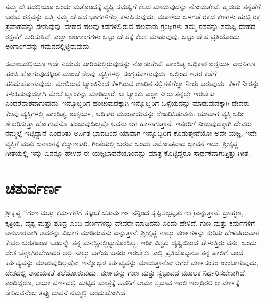ನಮ್ಮ ದೇಹದಲ್ಲಿಯೂ ಒಂದು ಮತ್ತೊಂದಕ್ಕೆ ವ್ಯಷ್ಟಿ ಸಮಷ್ಟಿಗೆ ಕೆಲಸ ಮಾಡುವುದನ್ನು ನೋಡುತ್ತೇವೆ. ಹೃದಯ ತನ್ನೆಡೆಗೆ ಬರುವ ರಕ್ತವನ್ನು ಒತ್ತಿ ನಮ್ಮ ದೇಹದ ಭಾಗಗಳಿಗೆಲ್ಲ ಕಳುಹಿಸುವುದು. ಮೂಳೆಯ ಒಳಗಡೆ ರಕ್ತದ ಕಣಗಳು ಹುಟ್ಟಿ ರಕ್ತ ಪ್ರವಾಹವನ್ನು ಸೇರುವುವು. ದೇಹದ ಹಲವು ಕಡೆಗಳಲ್ಲಿರುವ ಹಲವಾರು ಗ್ರಂಥಿಗಳು ತಮ್ಮ ರಸವನ್ನು ಸಮಷ್ಟಿ ದೇಹದ ರಕ್ಷಣೆಗೆ ಸುರಿಸುತ್ತಿವೆ. ಎಲ್ಲಾ ಅಂಗಾಂಗಗಳು ಒಟ್ಟು ದೇಹಕ್ಕೆ ಕೆಲಸ ಮಾಡುವುವು. ಒಟ್ಟು ದೇಹ ಪ್ರತಿಯೊಂದು ಅಂಗಾಂಗವನ್ನು ಗಮನದಲ್ಲಿಟ್ಟಿರುವುದು.

ಸಮಾಜದಲ್ಲಿಯೂ ಇದೇ ನಿಯಮ ಜಾರಿಯಲ್ಲಿರುವುದನ್ನು ನೋಡುತ್ತೇವೆ. ಪಾಂಡಿತ್ಯ ಅಧಿಕಾರ ಐಶ್ವರ್ಯ ಎಲ್ಲರಿಗೂ ಹಂಚಿ ಹೋಗುವುದಕ್ಕಿಂತ ಮುಂಚೆ ಕೆಲವು ವ್ಯಕ್ತಿಗಳಲ್ಲಿ ಸಂಗ್ರಹವಾಗುವುದು. ಅಲ್ಲಿಂದ ಇತರ ಕಡೆಗೆ ಹರಿದುಹೋಗುವುದು. ಮೇಲಿರುವ ಟ್ಯಾಂಕಿನಿಂದ ಕೆಳಗಿರುವ ಊರಿನ ನಲ್ಲಿಗಳಿಗೆಲ್ಲಾ ನೀರು ಬರುವುದು. ಕೆಳಗೆ ನೀರನ್ನು ಕಳುಹಿಸುವುದಕ್ಕಾಗಿ ಮೇಲೆ ಟ್ಯಾಂಕನ್ನು ಮಾಡಿದ್ದಾರೆ. ಆ ಟ್ಯಾಂಕು ಎಲ್ಲಾ ನೀರು ತನ್ನಲ್ಲೇ ಇರಬೇಕು ಎಂದರೆ\break ನಾಶವಾಗುವುದು. ಇನ್ನೊಬ್ಬರಿಗೆ ಹಂಚುವುದಕ್ಕಾಗಿ ಇನ್ನೊಬ್ಬರಿಗೆ ಒಳ್ಳೆಯದನ್ನು ಮಾಡುವುದಕ್ಕಾಗಿ ದೇವರು ಕೆಲವು ವ್ಯಕ್ತಿಗಳಲ್ಲಿ ಪಾಂಡಿತ್ಯ, ಐಶ್ವರ್ಯ, ಅಧಿಕಾರ ಮುಂತಾದುವನ್ನು ಶೇಖರಿಸಿಡುವನು. ಯಾವಾಗ ವ್ಯಕ್ತಿ ಬರೀ ಶೇಖರಿಸುತ್ತಾ ಹೋಗುವನೊ ಹಂಚುವುದಿಲ್ಲವೊ ಅವನು ಆಗ ಹಾಳಾಗುತ್ತಾನೆ. ಇತರರಿಗೆ ನೀಡುವುದಕ್ಕಾಗಿ ದೇವರು ನಮ್ಮಲ್ಲೆ ಇಟ್ಟಿದ್ದಾನೆ ಎಂದರಿತು ಅರ್ಪಿತ ಭಾವದಿಂದ ಯಾವಾಗ ಇನ್ನೊಬ್ಬರಿಗೆ ಕೊಡುತ್ತೇವೆಯೋ ಅದೇ ಯಜ್ಞ, ಇದೇ ವ್ಯಕ್ತಿಗೆ ಮತ್ತು ಜನಾಂಗಕ್ಕೆ ಕಲ್ಯಾಣಕಾರಿ. ಗೀತೆಯಲ್ಲಿ ಬರುವ ಒಂದು ಅಮೋಘವಾದ ಭಾವನೆ ಇದು. ಶ‍್ರೀಕೃಷ್ಣ ಗೀತೆಯಲ್ಲಿ ಇನ್ನು ಏನನ್ನೂ ಹೇಳದೆ ಈ ಯಜ್ಞಭಾವನೆಯೊಂದನ್ನು ಮಾತ್ರ ಕೊಟ್ಟಿದ್ದರೂ ಸಾರ್ಥಕ\-ವಾಗುತ್ತಿತ್ತು ಗೀತೆ.


\section*{ಚತುರ್ವರ್ಣ}

ಶ‍್ರೀಕೃಷ್ಣ “ಗುಣ ಮತ್ತು ಕರ್ಮಗಳಿಗೆ ತಕ್ಕಂತೆ ಚತುರ್ವರ್ಣ ನನ್ನಿಂದ ಸೃಷ್ಟಿಸಲ್ಪಟ್ಟಿತು ೧೩)ಎನ್ನುತ್ತಾನೆ. ಬ್ರಾಹ್ಮಣ, ಕ್ಷತ್ರಿಯ, ವೈಶ್ಯ ಮತ್ತು ಶೂದ್ರ ಎಂಬ ವರ್ಣಗಳನ್ನು ದೇವರೇ ಮಾಡಿದನು ಎಂದು ಹೇಳಿದೆ. ಗುಣ ಮತ್ತು ಕರ್ಮಗಳಿಗೆ ಅನುಸಾರವಾಗಿ ಅವರನ್ನು ವಿಭಾಗ ಮಾಡಿರುವೆನು ಎನ್ನುತ್ತಾನೆ. ಶ‍್ರೀಕೃಷ್ಣ ನಾಲ್ಕು ವರ್ಣಗಳನ್ನು ಕುರಿತು ಹೇಳುತ್ತಿರುವಾಗ ಕೇವಲ ಭರತಖಂಡ ಒಂದನ್ನೇ ತನ್ನ ಮನಸ್ಸಿನಲ್ಲಿಟ್ಟುಕೊಂಡಿಲ್ಲ. ಇಡೀ ವಿಶ್ವದ ದೃಷ್ಟಿಯಿಂದ ಹೇಳುತ್ತಿರು ವನು. ಒಂದು ದೇಶ ಚೆನ್ನಾಗಿರಬೇಕಾದರೆ ಅಲ್ಲಿ ನಾಲ್ಕು ಬಗೆಯ ಜನರು ಇರಬೇಕು. ಎಲ್ಲಿ ಪ್ರತಿಯೊಬ್ಬನೂ ತನ್ನ ಪಾಲಿಗೆ ಬಂದ ಕರ್ತವ್ಯವನ್ನು ಮಾಡುವುದಿಲ್ಲವೋ, ಇನ್ನೊಬ್ಬರ ಕರ್ತವ್ಯವನ್ನು ಮಾಡುತ್ತಾನೋ ಆಗಲೆ ವರ್ಣಸಂಕರ ಉಂಟಾಗುವುದು, ದೇಶದಲ್ಲಿ ಅನಾಯಕತೆ ತಲೆದೋರುವುದು. ವರ್ಣವನ್ನು ಗುಣ ಮತ್ತು ಸ್ವಭಾವದ ಮೂಲಕ ನಿರ್ಧರಿಸಬೇಕಾಗಿದೆ ಎಂದಿದ್ದರೂ, ಆಯಾ ವರ್ಣದಲ್ಲಿ ಹುಟ್ಟಿದ ಮಾತ್ರಕ್ಕೆ ಅವನಿಗೆ ಆಯಾ ಸ್ವಭಾವ ಇರಲಿ ಇಲ್ಲದಿರಲಿ ಆ ವರ್ಣಕ್ಕೆ ಸೇರಿದವನೆಂಬ ತಪ್ಪು ಭಾವನೆ ನಮ್ಮಲ್ಲಿ ಬಂದುಹೋಗಿದೆ.

